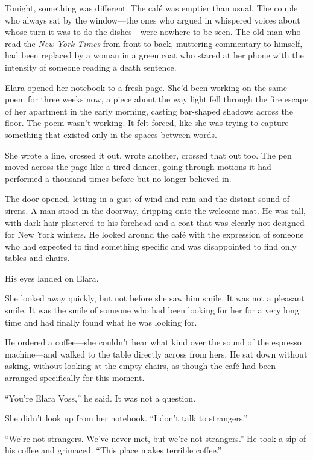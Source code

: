\documentclass[
    language=english,
    doctype=novel,
    institution=none,
]{../../omnilatex}
\begin{document}
Tonight, something was different. The café was emptier than usual. The couple who always sat by the window---the ones who argued in whispered voices about whose turn it was to do the dishes---were nowhere to be seen. The old man who read the \textit{New York Times} from front to back, muttering commentary to himself, had been replaced by a woman in a green coat who stared at her phone with the intensity of someone reading a death sentence.

Elara opened her notebook to a fresh page. She'd been working on the same poem for three weeks now, a piece about the way light fell through the fire escape of her apartment in the early morning, casting bar-shaped shadows across the floor. The poem wasn't working. It felt forced, like she was trying to capture something that existed only in the spaces between words.

She wrote a line, crossed it out, wrote another, crossed that out too. The pen moved across the page like a tired dancer, going through motions it had performed a thousand times before but no longer believed in.

The door opened, letting in a gust of wind and rain and the distant sound of sirens. A man stood in the doorway, dripping onto the welcome mat. He was tall, with dark hair plastered to his forehead and a coat that was clearly not designed for New York winters. He looked around the café with the expression of someone who had expected to find something specific and was disappointed to find only tables and chairs.

His eyes landed on Elara.

She looked away quickly, but not before she saw him smile. It was not a pleasant smile. It was the smile of someone who had been looking for her for a very long time and had finally found what he was looking for.

He ordered a coffee---she couldn't hear what kind over the sound of the espresso machine---and walked to the table directly across from hers. He sat down without asking, without looking at the empty chairs, as though the café had been arranged specifically for this moment.

``You're Elara Voss,'' he said. It was not a question.

She didn't look up from her notebook. ``I don't talk to strangers.''

``We're not strangers. We've never met, but we're not strangers.'' He took a sip of his coffee and grimaced. ``This place makes terrible coffee.''
\end{document}
